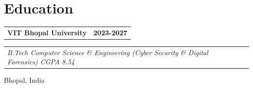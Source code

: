 \documentclass[11pt,a4paper]{article}
\makeatletter
\newcommand{\resumeHeader}[2]{%
  \noindent
  \begin{tabular*}{\textwidth}{@{}l@{\extracolsep{\fill}}r@{}}
    \textbf{#1} & \textbf{#2} \\
  \end{tabular*}%
}
\newcommand{\resumeSubheader}[2]{%
  \noindent
  \begin{tabular*}{\textwidth}{@{}l@{\extracolsep{\fill}}r@{}}
    \textit{#1} & \textit{#2} \\
  \end{tabular*}\vspace{2pt}%
}
\newcommand{\resumeEducationLocation}[1]{%
  \noindent #1\vspace{4pt}%
}
\makeatother
\begin{document}
\section{Education}

\resumeHeader{VIT Bhopal University}{2023-2027}
\resumeSubheader{B.Tech Computer Science \& Engineering (Cyber Security \& Digital Forensics) \textbar{} CGPA 8.54}{}
\resumeEducationLocation{Bhopal, India}
\end{document}
